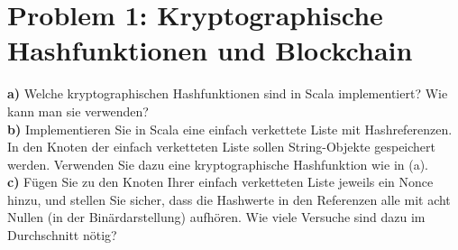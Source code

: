 \section*{Problem 1: Kryptographische Hashfunktionen und Blockchain}

\noindent
\textbf{a)} Welche kryptographischen Hashfunktionen sind in Scala implementiert? Wie kann man sie verwenden?\\

\noindent
\textbf{b)} Implementieren Sie in Scala eine einfach verkettete Liste mit Hashreferenzen. In den Knoten der einfach verketteten Liste sollen String-Objekte gespeichert werden. Verwenden Sie dazu eine kryptographische Hashfunktion wie in (a).\\

\noindent
\textbf{c)} Fügen Sie zu den Knoten Ihrer einfach verketteten Liste jeweils ein Nonce hinzu, und stellen Sie sicher, dass die Hashwerte in den Referenzen alle mit acht Nullen (in der Binärdarstellung) aufhören. Wie viele Versuche sind dazu im Durchschnitt nötig?\\